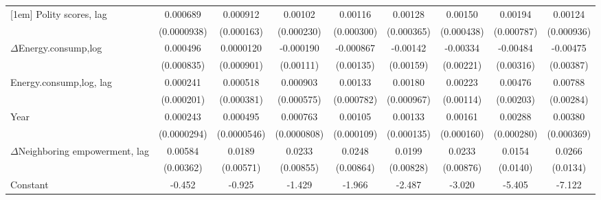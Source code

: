 \begin{table}[htbp]
\begin{tabular}{l*{8}{c}}
[1em]
Polity scores, lag           &    0.000689\sym{***}&    0.000912\sym{***}&     0.00102\sym{***}&     0.00116\sym{***}&     0.00128\sym{***}&     0.00150\sym{***}&     0.00194\sym{**} &     0.00124         \\
                    & (0.0000938)         &  (0.000163)         &  (0.000230)         &  (0.000300)         &  (0.000365)         &  (0.000438)         &  (0.000787)         &  (0.000936)         \\
[1em]
$\Delta$Energy.consump,log            &    0.000496         &   0.0000120         &   -0.000190         &   -0.000867         &    -0.00142         &    -0.00334         &    -0.00484         &    -0.00475         \\
                    &  (0.000835)         &  (0.000901)         &   (0.00111)         &   (0.00135)         &   (0.00159)         &   (0.00221)         &   (0.00316)         &   (0.00387)         \\
[1em]
Energy.consump,log, lag            &    0.000241         &    0.000518         &    0.000903         &     0.00133\sym{*}  &     0.00180\sym{*}  &     0.00223\sym{*}  &     0.00476\sym{**} &     0.00788\sym{***}\\
                    &  (0.000201)         &  (0.000381)         &  (0.000575)         &  (0.000782)         &  (0.000967)         &   (0.00114)         &   (0.00203)         &   (0.00284)         \\
[1em]
Year                &    0.000243\sym{***}&    0.000495\sym{***}&    0.000763\sym{***}&     0.00105\sym{***}&     0.00133\sym{***}&     0.00161\sym{***}&     0.00288\sym{***}&     0.00380\sym{***}\\
                    & (0.0000294)         & (0.0000546)         & (0.0000808)         &  (0.000109)         &  (0.000135)         &  (0.000160)         &  (0.000280)         &  (0.000369)         \\
[1em]
$\Delta$Neighboring empowerment, lag&     0.00584         &      0.0189\sym{***}&      0.0233\sym{***}&      0.0248\sym{***}&      0.0199\sym{**} &      0.0233\sym{***}&      0.0154         &      0.0266\sym{**} \\
                    &   (0.00362)         &   (0.00571)         &   (0.00855)         &   (0.00864)         &   (0.00828)         &   (0.00876)         &    (0.0140)         &    (0.0134)         \\
[1em]
Constant            &      -0.452\sym{***}&      -0.925\sym{***}&      -1.429\sym{***}&      -1.966\sym{***}&      -2.487\sym{***}&      -3.020\sym{***}&      -5.405\sym{***}&      -7.122\sym{***}\\

\end{tabular}
\end{table}
